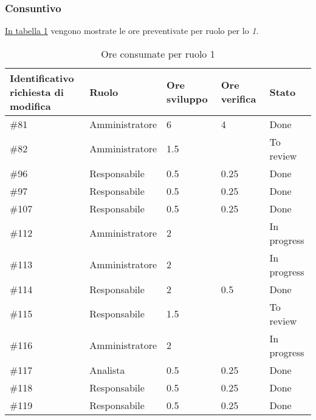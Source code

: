 \subsubsection{Consuntivo}

\hyperref[tab:sprint1_ore_consumate]{In tabella \ref{tab:sprint1_ore_consumate}} vengono mostrate le ore preventivate per ruolo per lo \textit{ 1}.

\begin{table}[H]
    \centering
        \begin{tabular}{| l | l | l | l | l |}
            \hline
            \makecell{\textbf{Identificativo} \\ \textbf{richiesta di modifica}} &
                \textbf{Ruolo} & 
                \textbf{Ore sviluppo} &
                \textbf{Ore verifica} & 
                \textbf{Stato}\\ 
    \hline
        \#81 & Amministratore & 6 & 4 & Done\\
    \hline
        \#82 & Amministratore& 1.5 &  & To review\\
    \hline
        \#96 & Responsabile & 0.5 & 0.25 & Done\\
    \hline
        \#97 & Responsabile & 0.5 & 0.25 & Done\\
    \hline
        \#107 & Responsabile & 0.5 & 0.25 & Done\\
    \hline
        \#112 & Amministratore & 2 & & In progress\\
    \hline
        \#113 & Amministratore & 2 & & In progress\\
    \hline
        \#114 & Responsabile & 2 & 0.5 & Done\\
    \hline
        \#115 & Responsabile & 1.5 & & To review\\
    \hline
        \#116 & Amministratore & 2 & & In progress\\
    \hline
        \#117 & Analista & 0.5 & 0.25 & Done\\
    \hline
        \#118 & Responsabile & 0.5 & 0.25 & Done\\
    \hline
        \#119 & Responsabile & 0.5 & 0.25 & Done\\
    \hline
    \end{tabular}
    \caption{Ore consumate per ruolo  1}
    \label{tab:sprint1_ore_consumate} 
\end{table}